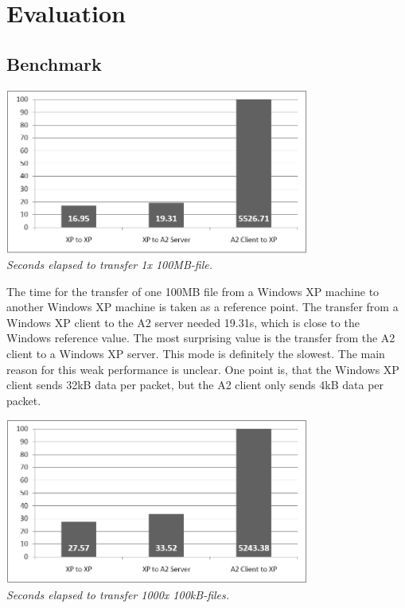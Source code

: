 \documentclass[11pt,a4paper]{book}
\begin{document}
\chapter{Evaluation}

\section{Benchmark}

\begin{center}
\includegraphics[width=10cm]{1x100mb.png} \\
\vspace{6pt}
\textit{Seconds elapsed to transfer 1x 100MB-file.}
\end{center}

The time for the transfer of one 100MB file from a Windows XP machine to another Windows XP machine is taken as a reference point. The transfer from a Windows XP client to the A2 server needed 19.31s, which is close to the Windows reference value. The most surprising value is the transfer from the A2 client to a Windows XP server. This mode is definitely the slowest. The main reason for this weak performance is unclear. One point is, that the Windows XP client sends 32kB data per packet, but the A2 client only sends 4kB data per packet. 

\begin{center}
\includegraphics[width=10cm]{1000x100kb.png} \\
\vspace{6pt}
\textit{Seconds elapsed to transfer 1000x 100kB-files.}
\end{center}
\end{document}
